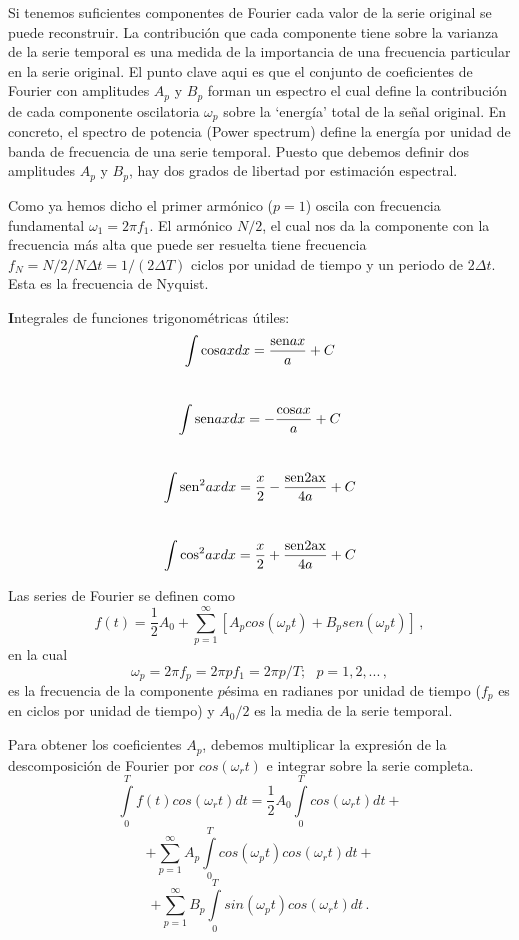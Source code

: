 \documentclass[
]{agujournal2019}
\begin{document}
Si tenemos suficientes componentes de Fourier cada valor de la serie
original se puede reconstruir. La contribución que cada componente tiene
sobre la varianza de la serie temporal es una medida de la importancia
de una frecuencia particular en la serie original. El punto clave aqui
es que el conjunto de coeficientes de Fourier con amplitudes \(A_p\) y
\(B_p\) forman un espectro el cual define la contribución de cada
componente oscilatoria \(\omega_p\) sobre la `energía' total de la señal
original. En concreto, el spectro de potencia (Power spectrum) define la
energía por unidad de banda de frecuencia de una serie temporal. Puesto
que debemos definir dos amplitudes \(A_p\) y \(B_p\), hay dos grados de
libertad por estimación espectral.

Como ya hemos dicho el primer armónico (\(p=1\)) oscila con frecuencia
fundamental \(\omega_1=2\pi f_1\). El armónico \(N/2\), el cual nos da
la componente con la frecuencia más alta que puede ser resuelta tiene
frecuencia \(f_N=N/2/N\Delta t=1/(2\Delta T)\) ciclos por unidad de
tiempo y un periodo de \(2\Delta t\). Esta es la frecuencia de Nyquist.

\begin{framed}
{\noindent \textbf Integrales de funciones trigonométricas útiles:}
\\
$$\int {\rm cos} ax dx =\frac{{\rm sen} ax}{a} + C$$
\\
$$\int {\rm sen} ax dx =-\frac{{\rm cos} ax}{a} + C$$
\\
$$\int {\rm sen}^2 ax dx =\frac{x}{2}-\frac{\rm{sen} 2ax}{4a} + C$$
\\
$$\int {\rm cos}^2 ax dx =\frac{x}{2}+\frac{\rm{sen} 2ax}{4a} + C$$

\end{framed}

Las series de Fourier se definen como
\[f(t)=\frac{1}{2}A_0 +\sum\limits^\infty_{p=1}[A_p cos(\omega_p t) + B_p sen(\omega_p t)]\,,\]
en la cual
\[\omega_p=2\pi f_p=2\pi p f_1=2\pi p /T;\,\,\,\,p=1,2,...\,,\] es la
frecuencia de la componente \(p\)ésima en radianes por unidad de tiempo
(\(f_p\) es en ciclos por unidad de tiempo) y \(A_0/2\) es la media de
la serie temporal.

Para obtener los coeficientes \(A_p\), debemos multiplicar la expresión
de la descomposición de Fourier por \(cos(\omega_r t)\) e integrar sobre
la serie completa.
\[\int\limits^{T}_{0}f(t)cos(\omega_r t)dt=\frac{1}{2}A_0\int\limits^{T}_{0} cos(\omega_r t) dt + \]
\[+\sum\limits^\infty_{p=1} A_p \int\limits^{T}_{0}cos(\omega_p t)cos(\omega_r t) dt +\]
\[+\sum\limits^\infty_{p=1} B_p \int\limits^{T}_{0}sin(\omega_p t)cos(\omega_r t) dt\,.\]
\end{document}
